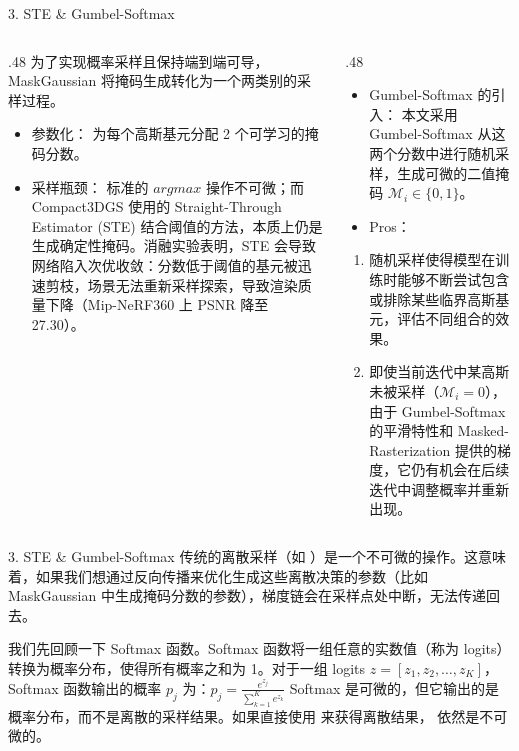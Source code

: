 \documentclass[aspectratio=169,10pt]{beamer}
\begin{document}
\begin{frame}[fragile,shrink=12]{3. STE \& Gumbel-Softmax}
\footnotesize
\begin{columns}[T,onlytextwidth]
  \begin{column}{.48\textwidth}
    为了实现概率采样且保持端到端可导，MaskGaussian 将掩码生成转化为一个两类别的采样过程。
\begin{itemize}
\item \alert{参数化：} 为每个高斯基元分配 2 个可学习的掩码分数。
\item \alert{采样瓶颈：} 标准的 \(argmax\) 操作不可微；而 Compact3DGS 使用的 Straight-Through Estimator (STE) 结合阈值的方法，本质上仍是生成确定性掩码。消融实验表明，STE 会导致网络陷入次优收敛：分数低于阈值的基元被迅速剪枝，场景无法重新采样探索，导致渲染质量下降（Mip-NeRF360 上 PSNR 降至 27.30）。
\end{itemize}
  \end{column}
  \begin{column}{.48\textwidth}
    \begin{itemize}
    \item
      \alert{Gumbel-Softmax 的引入：} 本文采用 Gumbel-Softmax 从这两个分数中进行随机采样，生成可微的二值掩码 \(\mathcal{M}_i \in \{0, 1\}\)。
    \item
      \alert{Pros：}
    \end{itemize}
    
    \begin{enumerate}
    \def\labelenumi{\arabic{enumi}.}
    \item
      随机采样使得模型在训练时能够不断尝试包含或排除某些临界高斯基元，评估不同组合的效果。
    \item
      即使当前迭代中某高斯未被采样（\(\mathcal{M}_i = 0\)），由于 Gumbel-Softmax 的平滑特性和 Masked-Rasterization 提供的梯度，它仍有机会在后续迭代中调整概率并重新出现。
    \end{enumerate}
  \end{column}
\end{columns}
\end{frame}

\begin{frame}[fragile,shrink=12]{3. STE \& Gumbel-Softmax}
\footnotesize
传统的离散采样（如 ）是一个不可微的操作。这意味着，如果我们想通过反向传播来优化生成这些离散决策的参数（比如 MaskGaussian 中生成掩码分数的参数），梯度链会在采样点处中断，无法传递回去。

我们先回顾一下 Softmax 函数。Softmax 函数将一组任意的实数值（称为 logits）转换为概率分布，使得所有概率之和为 1。对于一组 logits \(z = [z_1, z_2, \dots, z_K]\)，Softmax 函数输出的概率 \(p_j\) 为：\(p_j = \frac{e^{z_j}}{\sum_{k=1}^{K} e^{z_k}}\) Softmax 是可微的，但它输出的是概率分布，而不是离散的采样结果。如果直接使用  来获得离散结果， 依然是不可微的。
\end{frame}
\end{document}
